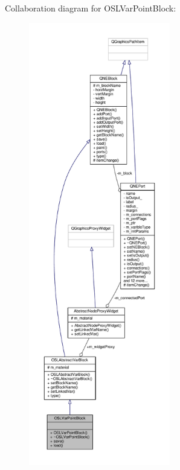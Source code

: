 Collaboration diagram for O\-S\-L\-Var\-Point\-Block\-:
\nopagebreak
\begin{figure}[H]
\begin{center}
\leavevmode
\includegraphics[height=550pt]{class_o_s_l_var_point_block__coll__graph}
\end{center}
\end{figure}
